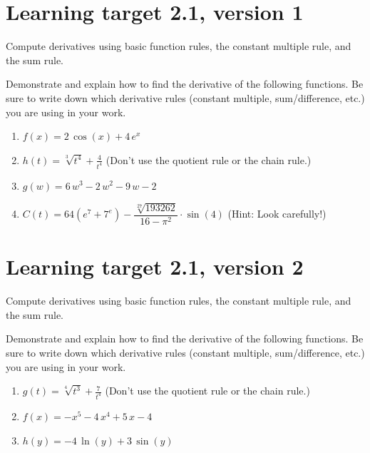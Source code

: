 
\usepackage{pgfplots}

\everymath{\displaystyle}


\section{Learning target 2.1, version 1}

Compute derivatives using basic function rules, the constant multiple rule, and the sum rule.

\hrulefill

Demonstrate and explain how to find the derivative of the following functions. Be sure to write down which derivative rules (constant multiple, sum/difference, etc.) you are using in your work.

\begin{enumerate}
    \item \(f(x) = 2 \, \cos\left(x\right) + 4 \, e^{x}\) 
    \vfill
    \item \(h(t) = \sqrt[3]{t^4} + \frac{4}{t^{4}}\) \quad (Don't use the quotient rule or the chain rule.)
    \vfill
    \item \(g(w) = 6 \, w^{3} - 2 \, w^{2} - 9 \, w - 2\)
    \vfill
    \item \(C(t) = 64(e^7 + 7^e)- \dfrac{\sqrt[27]{193262}}{16-\pi^2}\cdot\sin(4)\) \quad
(Hint: Look carefully!)
\end{enumerate}



\pagebreak

\section{Learning target 2.1, version 2}

Compute derivatives using basic function rules, the constant multiple rule, and the sum rule.

\hrulefill

Demonstrate and explain how to find the derivative of the following functions. Be sure to write down which derivative rules (constant multiple, sum/difference, etc.) you are using in your work.

\begin{enumerate}
    \item \(g(t) = \sqrt[4]{t^3} + \frac{7}{t^{4}}\) \quad (Don't use the quotient rule or the chain rule.)
    \vfill
    \item \(f(x) = -x^{5} - 4 \, x^{4} + 5 \, x - 4\)
    \vfill
    \item \(h(y) = -4 \, \ln\left(y\right) + 3 \, \sin\left(y\right)\)
    \vfill
\end{enumerate}


